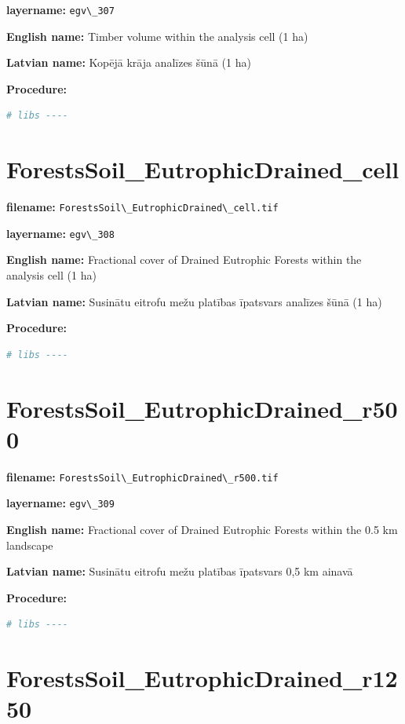 \documentclass[
]{book}
\newcommand{\passthrough}[1]{#1}
\begin{document}
\textbf{layername:} \passthrough{\lstinline!egv\_307!}

\textbf{English name:} Timber volume within the analysis cell (1 ha)

\textbf{Latvian name:} Kopējā krāja analīzes šūnā (1 ha)

\textbf{Procedure:}

\begin{lstlisting}[language=R]
# libs ----
\end{lstlisting}

\section{ForestsSoil\_EutrophicDrained\_cell}\label{ch06.308}

\textbf{filename:} \passthrough{\lstinline!ForestsSoil\_EutrophicDrained\_cell.tif!}

\textbf{layername:} \passthrough{\lstinline!egv\_308!}

\textbf{English name:} Fractional cover of Drained Eutrophic Forests within the analysis cell (1 ha)

\textbf{Latvian name:} Susinātu eitrofu mežu platības īpatsvars analīzes šūnā (1 ha)

\textbf{Procedure:}

\begin{lstlisting}[language=R]
# libs ----
\end{lstlisting}

\section{ForestsSoil\_EutrophicDrained\_r500}\label{ch06.309}

\textbf{filename:} \passthrough{\lstinline!ForestsSoil\_EutrophicDrained\_r500.tif!}

\textbf{layername:} \passthrough{\lstinline!egv\_309!}

\textbf{English name:} Fractional cover of Drained Eutrophic Forests within the 0.5 km landscape

\textbf{Latvian name:} Susinātu eitrofu mežu platības īpatsvars 0,5 km ainavā

\textbf{Procedure:}

\begin{lstlisting}[language=R]
# libs ----
\end{lstlisting}

\section{ForestsSoil\_EutrophicDrained\_r1250}\label{ch06.310}
\end{document}

